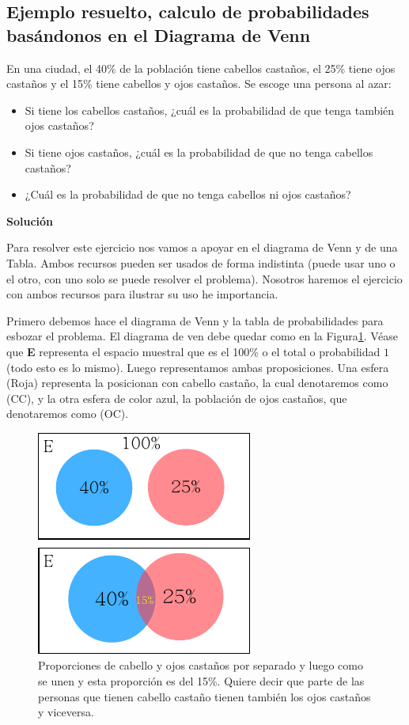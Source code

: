 \documentclass[11pt,letterpaper]{report}
\begin{document}
      \subsection{Ejemplo resuelto, calculo de probabilidades basándonos en el Diagrama de Venn}
        En una ciudad, el 40\% de la población tiene cabellos castaños, el 25\% tiene ojos castaños y el 15\% tiene cabellos y ojos castaños. Se escoge una persona al azar:
        \begin{itemize}
            \item Si tiene los cabellos castaños, ¿cuál es la probabilidad de que tenga también ojos castaños?
            \item Si tiene ojos castaños, ¿cuál es la probabilidad de que no tenga cabellos castaños?
            \item ¿Cuál es la probabilidad de que no tenga cabellos ni ojos castaños?
        \end{itemize}

        \textbf{Solución}

        Para resolver este ejercicio nos vamos a apoyar en el diagrama de Venn y de una Tabla. Ambos recursos pueden ser usados de forma indistinta (puede usar uno o el otro, con uno solo se puede resolver el problema). Nosotros haremos el ejercicio con ambos recursos para ilustrar su uso he importancia.

        Primero debemos hace el diagrama de Venn y la tabla de probabilidades para esbozar el problema. El diagrama de ven debe quedar como en la Figura\ref{fig:cp3}. Véase que \textbf{E} representa el espacio muestral que es el 100\% o el total o probabilidad $1$ (todo esto es lo mismo). Luego representamos ambas proposiciones. Una esfera (Roja) representa la posicionan con cabello castaño, la cual denotaremos como (CC), y la otra esfera de color azul, la población de ojos castaños, que denotaremos como (OC).


        \begin{figure}[!h]
            \centering
            \includegraphics[width=0.4\linewidth]{images/cp3}
            \caption{Proporciones de cabello y ojos castaños por separado y luego como se unen y esta proporci\'on es del 15\%. Quiere decir que parte de las personas que tienen cabello castaño tienen también los ojos castaños y viceversa.}
            \label{fig:cp3}
        \end{figure}
\end{document}
